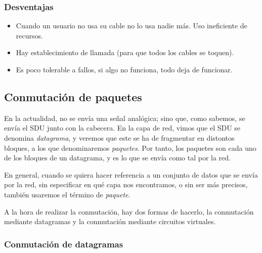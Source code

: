 \subsubsection{Desventajas}
\begin{itemize}
    \item Cuando un usuario no usa su cable no lo usa nadie más. Uso ineficiente de recursos.
    \item Hay establecimiento de llamada (para que todos los cables se toquen).
    \item Es poco tolerable a fallos, si algo no funciona, todo deja de funcionar.
\end{itemize}

\subsection{Conmutación de paquetes}
En la actualidad, no se envía una señal analógica; sino que, como sabemos, se envía el \acrshort{SDU} junto con la cabecera. En la capa de red, vimos que el \acrshort{SDU} se denomina \emph{datagrama}, y veremos que este se ha de fragmentar en distontos bloques, a los que denominaremos \emph{paquetes}. Por tanto, los paquetes son cada uno de los bloques de un datagrama, y es lo que se envía como tal por la red.
\begin{observacion}
    En general, cuando se quiera hacer referencia a un conjunto de datos que se envía por la red, sin especificar en qué capa nos encontramos, o sin ser más precisos, también usaremos el término de \emph{paquete}.
\end{observacion}

A la hora de realizar la conmutación, hay dos formas de hacerlo, la conmutación mediante datagramas y la conmutación mediante circuitos virtuales.

\subsubsection{Conmutación de datagramas}\label{sec:conmutacion_de_datagramas}

